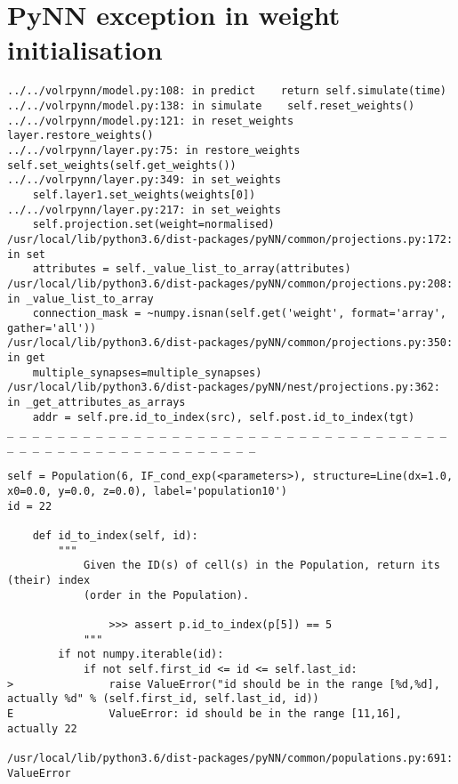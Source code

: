 


\section{PyNN exception in weight initialisation}

\begin{lstlisting}[caption={PyNN exception when performing weight
initialisation during a test in \texttt{test\_merge.py}.},label={lst:pynn_exception}]
../../volrpynn/model.py:108: in predict    return self.simulate(time)                                                                                         
../../volrpynn/model.py:138: in simulate    self.reset_weights()
../../volrpynn/model.py:121: in reset_weights    layer.restore_weights()                                                                                            
../../volrpynn/layer.py:75: in restore_weights    self.set_weights(self.get_weights())
../../volrpynn/layer.py:349: in set_weights
    self.layer1.set_weights(weights[0])
../../volrpynn/layer.py:217: in set_weights
    self.projection.set(weight=normalised)
/usr/local/lib/python3.6/dist-packages/pyNN/common/projections.py:172: in set                                          
    attributes = self._value_list_to_array(attributes)
/usr/local/lib/python3.6/dist-packages/pyNN/common/projections.py:208: in _value_list_to_array                         
    connection_mask = ~numpy.isnan(self.get('weight', format='array', gather='all'))                                   
/usr/local/lib/python3.6/dist-packages/pyNN/common/projections.py:350: in get                                          
    multiple_synapses=multiple_synapses)
/usr/local/lib/python3.6/dist-packages/pyNN/nest/projections.py:362: in _get_attributes_as_arrays                      
    addr = self.pre.id_to_index(src), self.post.id_to_index(tgt)                                                       
_ _ _ _ _ _ _ _ _ _ _ _ _ _ _ _ _ _ _ _ _ _ _ _ _ _ _ _ _ _ _ _ _ _ _ _ _ _ _ _ _ _ _ _ _ _ _ _ _ _ _ _ _ _ _          

self = Population(6, IF_cond_exp(<parameters>), structure=Line(dx=1.0, x0=0.0, y=0.0, z=0.0), label='population10')    
id = 22

    def id_to_index(self, id):
        """
            Given the ID(s) of cell(s) in the Population, return its (their) index
            (order in the Population).
    
                >>> assert p.id_to_index(p[5]) == 5
            """
        if not numpy.iterable(id):
            if not self.first_id <= id <= self.last_id:
>               raise ValueError("id should be in the range [%d,%d], actually %d" % (self.first_id, self.last_id, id))
E               ValueError: id should be in the range [11,16], actually 22

/usr/local/lib/python3.6/dist-packages/pyNN/common/populations.py:691: ValueError
\end{lstlisting}
